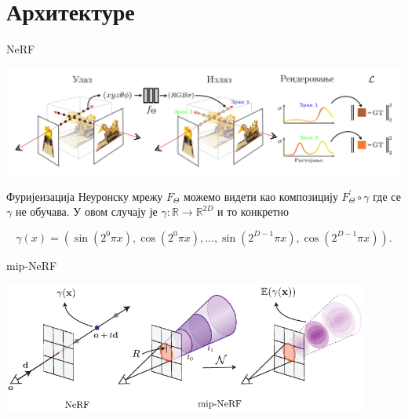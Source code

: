 \documentclass{beamer}
\begin{document}
	\section{Архитектуре}
		\begin{frame}{NeRF}
			\begin{center}
				\includegraphics[width=1\textwidth]{img/img/nerf-ss.png}
			\end{center}
		\end{frame}
	
		\begin{frame}{Фуријеизација}
			Неуронску мрежу $F_\Theta$ можемо видети као композицију $F_\Theta^\prime \circ \gamma$ где се $\gamma$
			не обучава. У овом случају је $\gamma : \mathbb{R} \rightarrow \mathbb{R}^{2D}$ и то конкретно
			
			\begin{equation*}
				\gamma(x) = (\sin(2^0\pi x), \cos(2^0 \pi x), ..., \sin(2^{D-1}\pi x), \cos(2^{D-1}\pi x)).
				\label{eqn-fourier-features}
			\end{equation*}
		\end{frame}
		
		\begin{frame}{mip-NeRF}
			\begin{center}
				\includegraphics[width=0.9\textwidth]{img/mipnerf.pdf}
			\end{center}
		\end{frame}
		
\end{document}
